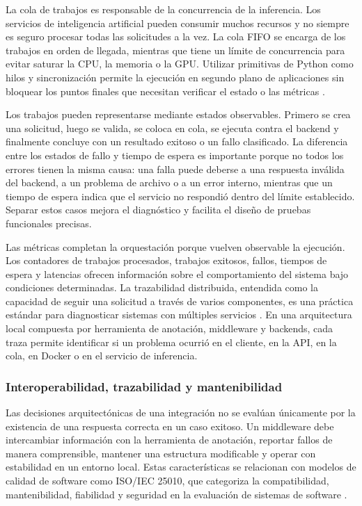 La cola de trabajos es responsable de la concurrencia de la inferencia. Los servicios de inteligencia artificial pueden consumir muchos recursos y no siempre es seguro procesar todas las solicitudes a la vez. La cola FIFO se encarga de los trabajos en orden de llegada, mientras que tiene un límite de concurrencia para evitar saturar la CPU, la memoria o la GPU. Utilizar primitivas de Python como hilos y sincronización permite la ejecución en segundo plano de aplicaciones sin bloquear los puntos finales que necesitan verificar el estado o las métricas \cite{python_threading}.

Los trabajos pueden representarse mediante estados observables. Primero se crea una solicitud, luego se valida, se coloca en cola, se ejecuta contra el backend y finalmente concluye con un resultado exitoso o un fallo clasificado. La diferencia entre los estados de fallo y tiempo de espera es importante porque no todos los errores tienen la misma causa: una falla puede deberse a una respuesta inválida del backend, a un problema de archivo o a un error interno, mientras que un tiempo de espera indica que el servicio no respondió dentro del límite establecido. Separar estos casos mejora el diagnóstico y facilita el diseño de pruebas funcionales precisas.

Las métricas completan la orquestación porque vuelven observable la ejecución. Los contadores de trabajos procesados, trabajos exitosos, fallos, tiempos de espera y latencias ofrecen información sobre el comportamiento del sistema bajo condiciones determinadas. La trazabilidad distribuida, entendida como la capacidad de seguir una solicitud a través de varios componentes, es una práctica estándar para diagnosticar sistemas con múltiples servicios \cite{sigelman2010dapper}. En una arquitectura local compuesta por herramienta de anotación, middleware y backends, cada traza permite identificar si un problema ocurrió en el cliente, en la API, en la cola, en Docker o en el servicio de inferencia.

\subsubsection{Interoperabilidad, trazabilidad y mantenibilidad}

Las decisiones arquitectónicas de una integración no se evalúan únicamente por la existencia de una respuesta correcta en un caso exitoso. Un middleware debe intercambiar información con la herramienta de anotación, reportar fallos de manera comprensible, mantener una estructura modificable y operar con estabilidad en un entorno local. Estas características se relacionan con modelos de calidad de software como ISO/IEC 25010, que categoriza la compatibilidad, mantenibilidad, fiabilidad y seguridad en la evaluación de sistemas de software \cite{iso25010}.

